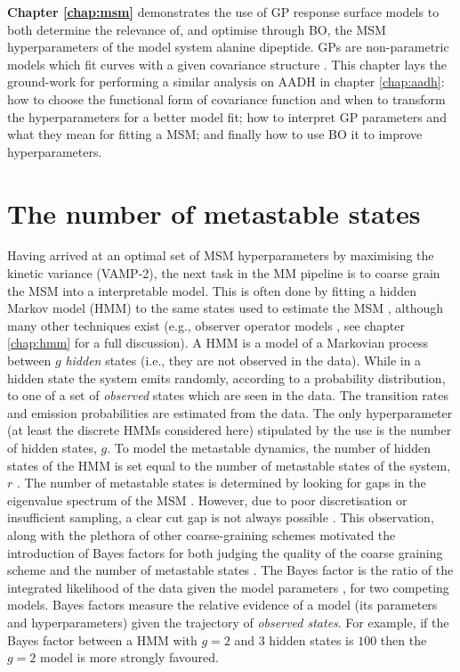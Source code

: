 \textbf{Chapter \ref{chap:msm}} demonstrates the use of GP response surface models to both determine the relevance of, and optimise through BO, the MSM hyperparameters of the model system alanine dipeptide. GPs are non-parametric models which fit curves with a given covariance structure \cite{rasmussenGaussianProcessesMachine2006}. This chapter lays the ground-work for performing a similar analysis on AADH in chapter \ref{chap:aadh}: how to choose the functional form of covariance function and when to transform the hyperparameters for a better model fit; how to interpret GP parameters and what they mean for fitting a MSM; and finally how to use BO it to improve hyperparameters. 

\section{The number of metastable states}
Having arrived at an optimal set of MSM hyperparameters by maximising the kinetic variance (VAMP-2), the next task in the MM pipeline is to coarse grain the MSM into a interpretable model. This is often done by fitting a hidden Markov model (HMM) to the same states used to estimate the MSM \cite{noeMarkovModelsMolecular2019b}, although many other techniques exist (e.g., observer operator models \cite{wuProjectedMetastableMarkov2015}, see chapter \ref{chap:hmm} for a full discussion). A HMM is a model of a Markovian process between $g$ \emph{hidden} states (i.e., they are not observed in the data). While in a hidden state the system emits randomly, according to a probability distribution, to one of a set of \emph{observed} states which are seen in the data. The transition rates and emission probabilities are estimated from the data.  The only hyperparameter (at least the discrete HMMs considered here) stipulated by the use is the number of hidden states, $g$. To model the metastable dynamics, the number of hidden states of the HMM is set equal to the number of metastable states of the system, $r$ \cite{noeProjectedHiddenMarkov2013a}. The number of metastable states is determined by looking for gaps in the eigenvalue spectrum of the MSM \cite{prinzMarkovModelsMolecular2011,noeProjectedHiddenMarkov2013a}. However, due to poor discretisation or insufficient sampling, a clear cut gap is not always possible \cite{bowmanQuantitativeComparisonAlternative2013}. This observation, along with the plethora of other coarse-graining schemes motivated the introduction of Bayes factors \cite{kassBayesFactors1995} for both judging the quality of the coarse graining scheme and the number of metastable states \cite{bacalladoBayesianComparisonMarkov2009a}. The Bayes factor is the ratio of the integrated likelihood of the data given the model parameters \cite{kassBayesFactors1995}, for two competing models. Bayes factors measure the relative evidence of a model (its parameters and hyperparameters) given the trajectory of \emph{observed states}. For example, if the Bayes factor between a HMM with $g=2$ and  $3$ hidden states is $100$ then the $g=2$ model is more strongly favoured. 

